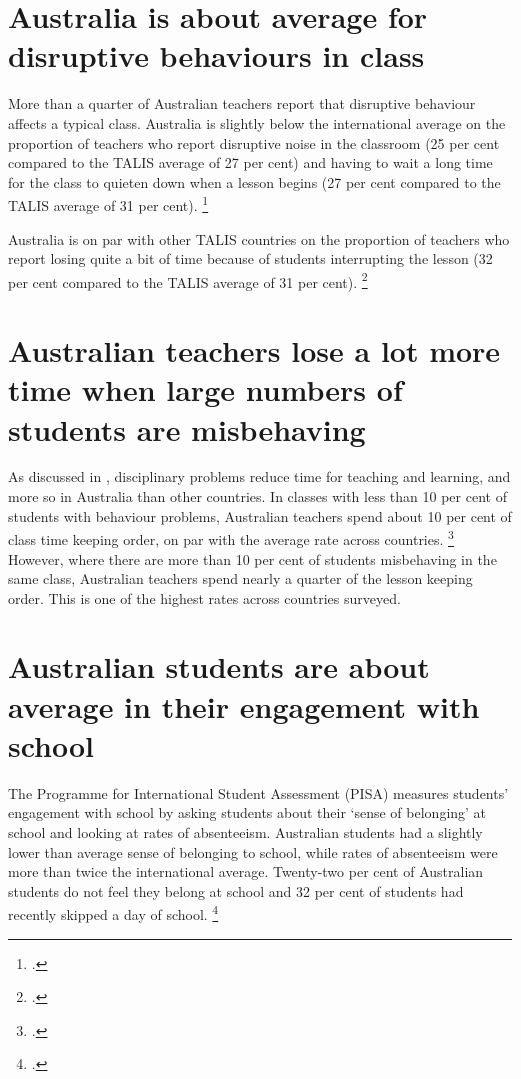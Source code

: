 \documentclass{grattan}
\begin{document}
\section{Australia is about average for disruptive behaviours in class }\label{subsec:australia-about-average}
More than a quarter of Australian teachers report that disruptive behaviour affects a typical class. Australia is slightly below the international average on the proportion of teachers who report disruptive noise in the classroom (25 per cent compared to the TALIS average of 27 per cent) and having to wait a long time for the class to quieten down when a lesson begins (27 per cent compared to the TALIS average of 31 per cent).%
    \footcite{OECD2014TALIS2013ResultsTeachingLearning}

Australia is on par with other TALIS countries on the proportion of teachers who report losing quite a bit of time because of students interrupting the lesson (32 per cent compared to the TALIS average of 31 per cent).%
    \footcite[][Table 6.6]{OECD2014TALIS2013ResultsTeachingLearning}
\section{Australian teachers lose a lot more time when large numbers of students are misbehaving}\label{sec:australian-teachers-lose-time}
As discussed in , disciplinary problems reduce time for teaching and learning, and more so in Australia than other countries. In classes with less than 10 per cent of students with behaviour problems, Australian teachers spend about 10 per cent of class time keeping order, on par with the average rate across countries.
\footcite[][Table 6.7]{Freeman2014AustralianTeachersLearning}
However, where there are more than 10 per cent of students misbehaving in the same class, Australian teachers spend nearly a quarter of the lesson keeping order. This is one of the highest rates across countries surveyed.

\section{Australian students are about average in their engagement with school}\label{sec:australian-students-average-engagement}
The Programme for International Student Assessment (PISA) measures students' engagement with school by asking students about their `sense of belonging' at school and looking at rates of absenteeism. Australian students had a slightly lower than average sense of belonging to school, while rates of absenteeism were more than twice the international average. Twenty-two per cent of Australian students do not feel they belong at school and 32 per cent of students had recently skipped a day of school.%
    \footcite{OECD2013PISA2012ResultsReadyToLearn}

\printbibliography
\end{document}
